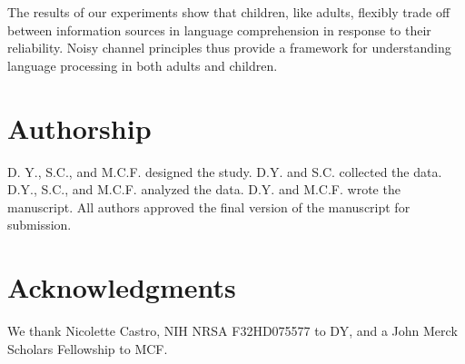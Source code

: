 \documentclass[man,floatsintext]{apa6}
\begin{document}
The results of our experiments show that children, like adults, flexibly trade off between information sources in language comprehension in response to their reliability. Noisy channel principles thus provide a framework for understanding language processing in both adults and children.


\section{Authorship}
D. Y., S.C., and M.C.F. designed the study. D.Y. and S.C. collected the data. D.Y., S.C., and M.C.F. analyzed the data. D.Y. and M.C.F. wrote the manuscript. All authors approved the final version of the manuscript for submission.

\section{Acknowledgments}

We thank Nicolette Castro, NIH NRSA F32HD075577 to DY, and a John Merck Scholars Fellowship to MCF.



\end{document}
